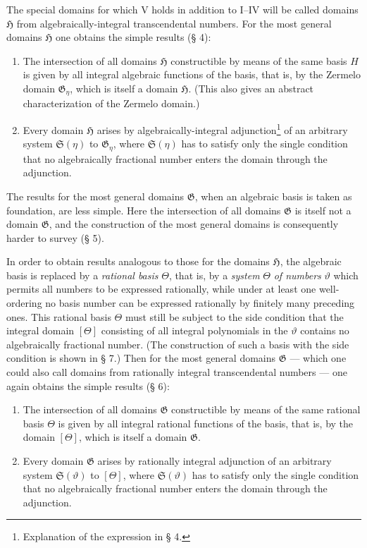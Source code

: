 \documentclass[11pt]{article}
\begin{document}
The special domains for which V holds in addition to I--IV will be called domains
$\mathfrak H$ from algebraically-integral transcendental numbers. For the most
general domains $\mathfrak H$ one obtains the simple results (§ 4):
\begin{enumerate}
\item[a)] The intersection of all domains $\mathfrak H$ constructible by means of
the same basis $H$ is given by all integral algebraic functions of the basis, that
is, by the Zermelo domain $\mathfrak G_\eta$, which is itself a domain
$\mathfrak H$. (This also gives an abstract characterization of the Zermelo
domain.)
\item[b)] Every domain $\mathfrak H$ arises by algebraically-integral
adjunction\footnote{Explanation of the expression in § 4.} of an arbitrary system
$\mathfrak S(\eta)$ to $\mathfrak G_\eta$, where $\mathfrak S(\eta)$ has to
satisfy only the single condition that no algebraically fractional number enters
the domain through the adjunction.
\end{enumerate}

The results for the most general domains $\mathfrak G$, when an algebraic basis
is taken as foundation, are less simple. Here the intersection of all domains
$\mathfrak G$ is itself not a domain $\mathfrak G$, and the construction of the
most general domains is consequently harder to survey (§ 5).

In order to obtain results analogous to those for the domains $\mathfrak H$, the
algebraic basis is replaced by a \emph{rational basis} $\Theta$, that is, by a
\emph{system} $\Theta$ \emph{of numbers} $\vartheta$ which permits all numbers
to be expressed rationally, while under at least one well-ordering no basis number
can be expressed rationally by finitely many preceding ones. This rational basis
$\Theta$ must still be subject to the side condition that the integral domain
$[\Theta]$ consisting of all integral polynomials in the $\vartheta$ contains no
algebraically fractional number. (The construction of such a basis with the side
condition is shown in § 7.) Then for the most general domains $\mathfrak G$ ---
which one could also call domains from rationally integral transcendental numbers
--- one again obtains the simple results (§ 6):
\begin{enumerate}
\item[a)] The intersection of all domains $\mathfrak G$ constructible by means of
the same rational basis $\Theta$ is given by all integral rational functions of the
basis, that is, by the domain $[\Theta]$, which is itself a domain $\mathfrak G$.
\item[b)] Every domain $\mathfrak G$ arises by rationally integral adjunction of
an arbitrary system $\mathfrak S(\vartheta)$ to $[\Theta]$, where
$\mathfrak S(\vartheta)$ has to satisfy only the single condition that no
algebraically fractional number enters the domain through the adjunction.
\end{enumerate}
\end{document}
